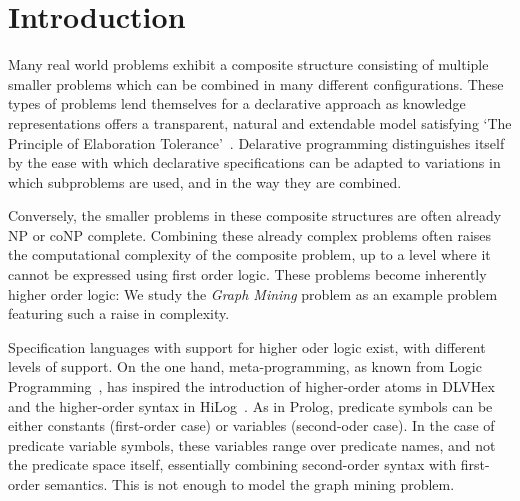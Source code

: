 \section{Introduction}
Many real world problems exhibit a composite structure consisting of multiple smaller problems which can be combined in many different configurations.
These types of problems lend themselves for a declarative approach as knowledge representations offers a transparent, natural and extendable model satisfying `The Principle of Elaboration Tolerance'~\citep{elaboration_tolerance}.
Delarative programming distinguishes itself by the ease with which declarative specifications can be adapted to variations in which subproblems are used, and in the way they are combined.

Conversely, the smaller problems in these composite structures are often already NP or coNP complete.
Combining these already complex problems often raises the computational complexity of the composite problem, up to a level where it cannot be expressed using first order logic.
These problems become inherently higher order logic: We study the \emph{Graph Mining} problem as an example problem featuring such a raise in complexity.

Specification languages with support for higher oder logic exist, with different levels of support.
On the one hand, meta-programming, as known from Logic Programming~\citep{abramson1989meta}, has inspired the introduction of higher-order atoms in DLVHex~\citep{conf/ijcai/EiterIST05}  and the higher-order syntax in HiLog~\citep{chen1993hilog}.
As in Prolog, predicate symbols can be either constants (first-order case) or variables (second-oder case).
In the case of predicate variable symbols, these variables range over predicate names, and not the predicate space itself, essentially combining second-order syntax with first-order semantics. 
This is not enough to model the graph mining problem.

